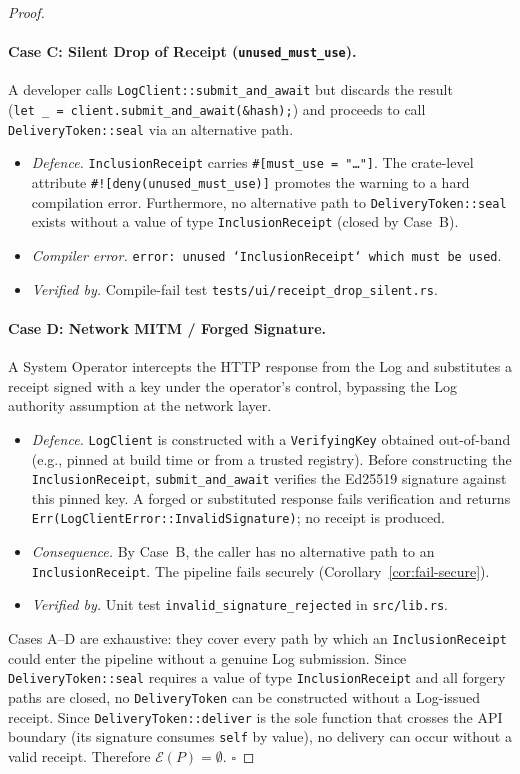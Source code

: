 \begin{proof}
\paragraph{Case C: Silent Drop of Receipt (\texttt{unused\_must\_use}).}
A developer calls \texttt{LogClient::submit\_and\_await} but discards
the result (\texttt{let~\_~=~client.submit\_and\_await(\&hash);})
and proceeds to call \texttt{DeliveryToken::seal} via an alternative
path.
\begin{itemize}
  \item \emph{Defence.} \texttt{InclusionReceipt} carries
  \texttt{\#[must\_use = "\ldots"]}. The crate-level attribute
  \texttt{\#![deny(unused\_must\_use)]} promotes the warning to a
  hard compilation error. Furthermore, no alternative path to
  \texttt{DeliveryToken::seal} exists without a value of type
  \texttt{InclusionReceipt} (closed by Case~B).
  \item \emph{Compiler error.} \texttt{error: unused `InclusionReceipt`
  which must be used}.
  \item \emph{Verified by.} Compile-fail test
  \texttt{tests/ui/receipt\_drop\_silent.rs}.
\end{itemize}

\paragraph{Case D: Network MITM / Forged Signature.}
A System Operator intercepts the HTTP response from the Log and
substitutes a receipt signed with a key under the operator's control,
bypassing the Log authority assumption at the network layer.
\begin{itemize}
  \item \emph{Defence.} \texttt{LogClient} is constructed with a
  \texttt{VerifyingKey} obtained out-of-band (e.g., pinned at build
  time or from a trusted registry). Before constructing the
  \texttt{InclusionReceipt}, \texttt{submit\_and\_await} verifies the
  Ed25519 signature against this pinned key. A forged or substituted
  response fails verification and returns
  \texttt{Err(LogClientError::InvalidSignature)}; no receipt is
  produced.
  \item \emph{Consequence.} By Case~B, the caller has no alternative
  path to an \texttt{InclusionReceipt}. The pipeline fails securely
  (Corollary~\ref{cor:fail-secure}).
  \item \emph{Verified by.} Unit test
  \texttt{invalid\_signature\_rejected} in \texttt{src/lib.rs}.
\end{itemize}

\medskip
Cases A--D are exhaustive: they cover every path by which an
\texttt{InclusionReceipt} could enter the pipeline without a genuine
Log submission. Since \texttt{DeliveryToken::seal} requires a value
of type \texttt{InclusionReceipt} and all forgery paths are closed,
no \texttt{DeliveryToken} can be constructed without a Log-issued
receipt. Since \texttt{DeliveryToken::deliver} is the sole function
that crosses the API boundary (its signature consumes \texttt{self}
by value), no delivery can occur without a valid receipt. Therefore
$\mathcal{E}(P) = \emptyset$. $\square$
\end{proof}

